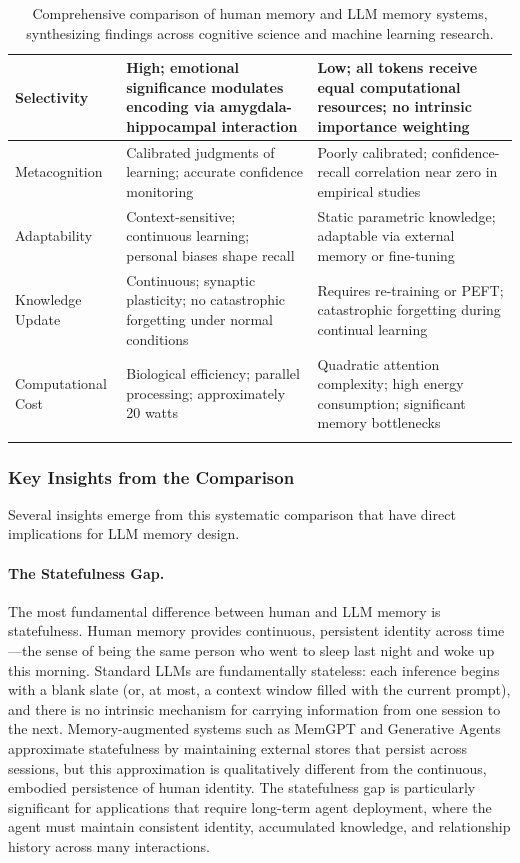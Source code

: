 \begin{longtable}{L{3.5cm}L{4.5cm}L{5cm}}
\midrule
Selectivity & High; emotional significance modulates encoding via amygdala-hippocampal interaction & Low; all tokens receive equal computational resources; no intrinsic importance weighting \\
\midrule
Metacognition & Calibrated judgments of learning; accurate confidence monitoring & Poorly calibrated; confidence-recall correlation near zero in empirical studies \\
\midrule
Adaptability & Context-sensitive; continuous learning; personal biases shape recall & Static parametric knowledge; adaptable via external memory or fine-tuning \\
\midrule
Knowledge Update & Continuous; synaptic plasticity; no catastrophic forgetting under normal conditions & Requires re-training or PEFT; catastrophic forgetting during continual learning \\
\midrule
Computational Cost & Biological efficiency; parallel processing; approximately 20 watts & Quadratic attention complexity; high energy consumption; significant memory bottlenecks \\
\bottomrule
\caption{Comprehensive comparison of human memory and LLM memory systems, synthesizing findings across cognitive science and machine learning research.}
\label{tab:human_llm_memory}
\end{longtable}

\subsubsection{Key Insights from the Comparison}

Several insights emerge from this systematic comparison that have direct implications for LLM memory design.

\paragraph{The Statefulness Gap.} The most fundamental difference between human and LLM memory is statefulness. Human memory provides continuous, persistent identity across time---the sense of being the same person who went to sleep last night and woke up this morning. Standard LLMs are fundamentally stateless: each inference begins with a blank slate (or, at most, a context window filled with the current prompt), and there is no intrinsic mechanism for carrying information from one session to the next. Memory-augmented systems such as MemGPT and Generative Agents approximate statefulness by maintaining external stores that persist across sessions, but this approximation is qualitatively different from the continuous, embodied persistence of human identity. The statefulness gap is particularly significant for applications that require long-term agent deployment, where the agent must maintain consistent identity, accumulated knowledge, and relationship history across many interactions.

